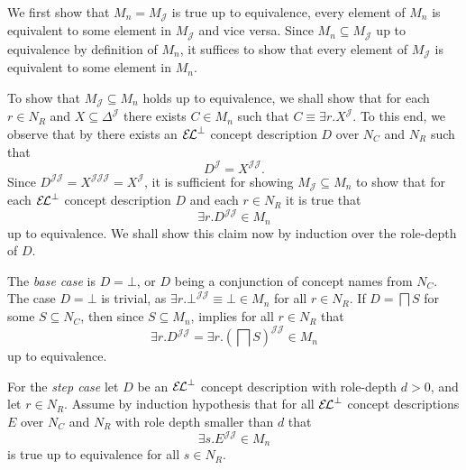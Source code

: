 \begin{Proof}
  We first show that $M_{n} = M_{\mathcal{J}}$ is true up to equivalence, \ie every
  element of $M_{n}$ is equivalent to some element in $M_{\mathcal{J}}$ and vice versa.
  Since $M_{n} \subseteq M_{\mathcal{J}}$ up to equivalence by definition of $M_{n}$, it
  suffices to show that every element of $M_{\mathcal{J}}$ is equivalent to some element
  in $M_{n}$.

  To show that $M_{\mathcal{J}} \subseteq M_{n}$ holds up to equivalence, we shall show
  that for each $r \in N_{R}$ and $X \subseteq \Delta^{\mathcal{J}}$ there exists $C \in
  M_{n}$ such that $C \equiv \exists r. X^{\mathcal{J}}$.  To this end, we observe that by
   there exists an ${{\mathcal{E}\kern-.3ex\mathcal{L}}^\bot}$ concept description $D$ over $N_{C}$ and
  $N_{R}$ such that
  \begin{equation*}
    D^{\mathcal{J}} = X^{\mathcal{J}\mathcal{J}}.
  \end{equation*}
  Since $D^{\mathcal{J}\mathcal{J}} = X^{\mathcal{J}\mathcal{J}\mathcal{J}} =
  X^{\mathcal{J}}$, it is sufficient for showing $M_{\mathcal{J}} \subseteq M_{n}$ to show
  that for each ${{\mathcal{E}\kern-.3ex\mathcal{L}}^\bot}$ concept description $D$ and each $r \in N_{R}$ it is true that
  \begin{equation*}
    \exists r. D^{\mathcal{J}\mathcal{J}} \in M_{n}
  \end{equation*}
  up to equivalence.  We shall show this claim now by induction over the role-depth of
  $D$.

  The \textit{base case} is $D = \bot$, or $D$ being a conjunction of concept names from
  $N_{C}$.  The case $D = \bot$ is trivial, as $\exists r. \bot^{\mathcal{J}\mathcal{J}}
  \equiv \bot \in M_{n}$ for all $r \in N_{R}$.  If $D = \bigsqcap S$ for some $S
  \subseteq N_{C}$, then since $S \subseteq M_{n}$,  implies
  for all $r \in N_{R}$ that
  \begin{equation*}
    \exists r. D^{\mathcal{J}\mathcal{J}} = \exists r. (\bigsqcap
    S)^{\mathcal{J}\mathcal{J}} \in M_{n}
  \end{equation*}
  up to equivalence.

  For the \textit{step case} let $D$ be an ${{\mathcal{E}\kern-.3ex\mathcal{L}}^\bot}$ concept description with role-depth $d
  > 0$, and let $r \in N_{R}$.  Assume by induction hypothesis that for all ${{\mathcal{E}\kern-.3ex\mathcal{L}}^\bot}$
  concept descriptions $E$ over $N_{C}$ and $N_{R}$ with role depth smaller than $d$ that
  \begin{equation}
    \label{eq:55}
    \exists s. E^{\mathcal{J}\mathcal{J}} \in M_{n}
  \end{equation}
  is true up to equivalence for all $s \in N_{R}$.


\end{Proof}
